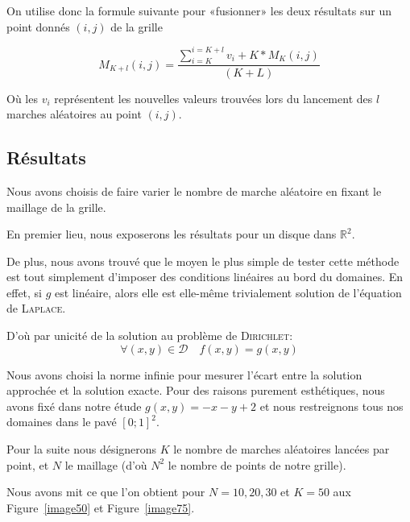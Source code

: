 \documentclass[12pt, a4paper]{article}
\begin{document}
On utilise donc la formule suivante pour «fusionner» les deux résultats sur un point donnés $(i,j)$
de la grille

\[
    M_{K+l}(i,j) = \frac{ \sum_{i=K}^{i=K+l} v_i + K*M_{K}(i,j) }{ (K + L) }
\]

Où les $v_i$ représentent les nouvelles valeurs trouvées lors du lancement des $l$ marches
aléatoires au point $(i,j)$.

\subsection{Résultats}

Nous avons choisis de faire varier le nombre de marche aléatoire en fixant le maillage de la grille.

En premier lieu, nous exposerons les résultats pour un disque dans $\mathbb{R}^2$.

De plus, nous avons trouvé que le moyen le plus simple de tester cette méthode est tout simplement
d'imposer des conditions linéaires au bord du domaines. En effet, si $g$ est linéaire, alors elle
est elle-même trivialement solution de l'équation de \textsc{Laplace}.

D'où par unicité de la solution au problème de \textsc{Dirichlet}:
\[\forall (x,y) \in \mathcal{D} \quad f(x,y) = g(x,y) \]

Nous avons choisi la norme infinie pour mesurer l'écart entre la solution approchée et la solution
exacte. Pour des raisons purement esthétiques, nous avons fixé dans notre étude $g(x,y) =
-x -y+2$ et nous restreignons tous nos domaines dans le pavé $[0;1]^2$.

Pour la suite nous désignerons $K$ le nombre de marches aléatoires lancées par point, et $N$ le
maillage (d'où $N^2$ le nombre de points de notre grille).

Nous avons mit ce que l'on obtient pour $N = {10, 20, 30}$ et $K = 50$ aux Figure~\ref{image50} et
Figure~\ref{image75}.
\end{document}
